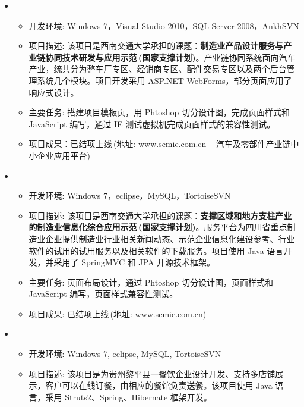 \documentclass[letterpaper,11pt]{article}
\begin{document}
  \begin{itemize}[leftmargin=*]
    \item
      {\footnotesize
      \begin{itemize}
        \item 开发环境: Windows 7，Visual Studio 2010，SQL Server 2008，AnkhSVN
        \item 项目描述: 该项目是西南交通大学承担的课题：\textbf{制造业产品设计服务与产业链协同技术研发与应用示范$\,$(国家支撑计划)}。产业链协同系统面向汽车产业，统共分为整车厂专区、经销商专区、配件交易专区以及两个后台管理系统几个模块。项目开发采用 ASP.NET WebForms，部分页面应用了响应式设计。
        \item 主要任务: 搭建项目模板页，用 Phtoshop 切分设计图，完成页面样式和 JavaScript 编写，通过 IE 测试虚拟机完成页面样式的兼容性测试。
        \item 项目成果：已结项上线$\,$(地址: www.scmie.com.cn -- 汽车及零部件产业链中小企业应用平台)
      \end{itemize}
      }
    \item
      {\footnotesize
      \begin{itemize}
        \item 开发环境: Windows 7，eclipse，MySQL，TortoiseSVN
        \item 项目描述: 该项目是西南交通大学承担的课题：\textbf{支撑区域和地方支柱产业的制造业信息化综合应用示范$\,$(国家支撑计划)}。服务平台为四川省重点制造业企业提供制造业行业相关新闻动态、示范企业信息化建设参考、行业软件的试用的试用服务以及相关软件的下载服务。项目使用 Java 语言开发，并采用了 SpringMVC 和 JPA 开源技术框架。
        \item 主要任务: 页面布局设计，通过 Phtoshop 切分设计图，页面样式和 JavaScript 编写，页面样式兼容性测试。
        \item 项目成果: 已结项上线$\,$(地址: www.scmie.com.cn)
      \end{itemize}
      }
    \item
    {\footnotesize
    \begin{itemize}
      \item 开发环境: Windows 7, eclipse, MySQL, TortoiseSVN
      \item 项目描述: 该项目是为贵州黎平县一餐饮企业设计开发、支持多店铺展示，客户可以在线订餐，由相应的餐馆负责送餐。该项目使用 Java 语言，采用 Struts2、Spring、Hibernate 框架开发。

\end{itemize}}
\end{itemize}
\end{document}
